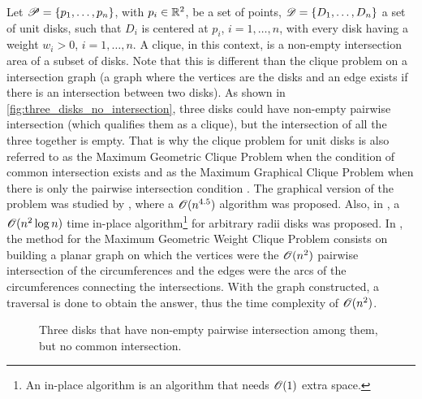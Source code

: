 Let $\mathscr{P}=\{p_1,\dots,p_n\}$, with $p_i \in \mathbb{R}^2$, be a set of points, $\mathscr{D}=\{D_1,\dots,D_n\}$ a set of unit disks, such that $D_i$ is centered at $p_i$, $i=1,\dots,n$, with every disk having a weight $w_i > 0$, $i=1,\dots,n$. A clique, in this context, is a non-empty intersection area of a subset of disks. Note that this is different than the clique problem on a intersection graph (a graph where the vertices are the disks and an edge exists if there is an intersection between two disks). As shown in \autoref{fig:three_disks_no_intersection}, three disks could have non-empty pairwise intersection (which qualifies them as a clique), but the intersection of all the three together is empty. That is why the clique problem for unit disks is also referred to as the Maximum Geometric Clique Problem when the condition of common intersection exists and as the Maximum Graphical Clique Problem when there is only the pairwise intersection condition \cite{inplace:2014}. The graphical version of the problem was studied by \cite{graphical-clique}, where a $\mathscr{O}(n^{4.5})$ algorithm was proposed. Also, in \cite{inplace:2014}, a $\mathscr{O}(n^2\log{n})$ time in-place algorithm\footnote{An in-place algorithm is an algorithm that needs $\mathscr{O}(1)$ extra space.} for arbitrary radii disks was proposed. In \cite{chazelle:1986}, the method for the Maximum Geometric Weight Clique Problem consists on building a planar graph on which the vertices were the $\mathscr{O}(n^2)$ pairwise intersection of the circumferences and the edges were the arcs of the circumferences connecting the intersections. With the graph constructed, a traversal is done to obtain the answer, thus the time complexity of $\mathscr{O}(n^2)$.

\begin{figure}[H]
\centering

    \caption{Three disks that have non-empty pairwise intersection among them, but no common intersection.}
    \label{fig:three_disks_no_intersection}
    \fautor
\end{figure}


